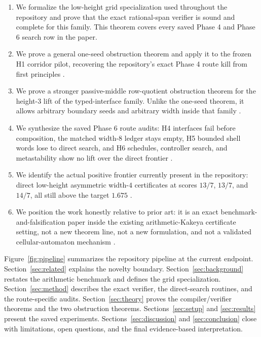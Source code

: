 \documentclass[11pt]{article}
\theoremstyle{definition}
\begin{document}
\begin{enumerate}
  \item We formalize the low-height grid specialization used throughout the repository and prove that the exact rational-span verifier is sound and complete for this family. This theorem covers every saved Phase 4 and Phase 6 search row in the paper.
  \item We prove a general one-seed obstruction theorem and apply it to the frozen \textsc{H1} corridor pilot, recovering the repository's exact Phase 4 route kill from first principles \citep{archivara_h1_obstruction,archivara_h1_program}.
  \item We prove a stronger passive-middle row-quotient obstruction theorem for the height-$3$ lift of the typed-interface family. Unlike the one-seed theorem, it allows arbitrary boundary seeds and arbitrary width inside that family \citep{archivara_geometry_lift,archivara_boundary_controller}.
  \item We synthesize the saved Phase 6 route audits: \textsc{H4} interfaces fail before composition, the matched width-$8$ ledger stays empty, \textsc{H5} bounded shell words lose to direct search, and \textsc{H6} schedules, controller search, and metastability show no lift over the direct frontier \citep{archivara_h4_typed_interfaces,archivara_complexity_frontier,archivara_h5_affine_shell,archivara_h6_defect_transport,archivara_boundary_controller,archivara_metastability}.
  \item We identify the actual positive frontier currently present in the repository: direct low-height asymmetric width-$4$ certificates at scores $13/7$, $13/7$, and $14/7$, all still above the target $1.675$ \citep{archivara_h5_affine_shell}.
  \item We position the work honestly relative to prior art: it is an exact benchmark-and-falsification paper inside the existing arithmetic-Kakeya certificate setting, not a new theorem line, not a new formulation, and not a validated cellular-automaton mechanism \citep{green2017,cowenbreen2020,pohoata2024,tao2025,archivara_prior_art_gap,archivara_verification}.
\end{enumerate}

Figure~\ref{fig:pipeline} summarizes the repository pipeline at the current endpoint. Section~\ref{sec:related} explains the novelty boundary. Section~\ref{sec:background} restates the arithmetic benchmark and defines the grid specialization. Section~\ref{sec:method} describes the exact verifier, the direct-search routines, and the route-specific audits. Section~\ref{sec:theory} proves the compiler/verifier theorems and the two obstruction theorems. Sections~\ref{sec:setup} and \ref{sec:results} present the saved experiments. Sections~\ref{sec:discussion} and \ref{sec:conclusion} close with limitations, open questions, and the final evidence-based interpretation.
\end{document}
